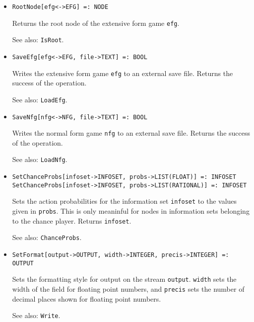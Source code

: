 \begin{itemize}
\item
\protect \large \begin{verbatim}
RootNode[efg<->EFG] =: NODE
\end{verbatim}\normalsize

\bd
Returns the root node of the extensive form game \verb+efg+.
\item
[See also:] {\tt IsRoot}.
\ed


\item
\protect \large \begin{verbatim}
SaveEfg[efg<->EFG, file->TEXT] =: BOOL
\end{verbatim}\normalsize

\bd
Writes the extensive form game \verb+efg+ to an external
save file.  Returns the success of the operation.
\item
[See also:] {\tt LoadEfg}.
\ed

\item
\protect \large \begin{verbatim}
SaveNfg[nfg<->NFG, file->TEXT] =: BOOL
\end{verbatim}\normalsize

\bd
Writes the normal form game \verb+nfg+ to an external
save file.  Returns the success of the operation.
\item
[See also:] {\tt LoadNfg}.
\ed

\item
\protect \large \begin{verbatim} 
SetChanceProbs[infoset->INFOSET, probs->LIST(FLOAT)] =: INFOSET
SetChanceProbs[infoset->INFOSET, probs->LIST(RATIONAL)] =: INFOSET
\end{verbatim}\normalsize

\bd
Sets the action probabilities for the information set
\verb+infoset+ to the values given in \verb+probs+.  This is only
meaninful for nodes in information sets belonging to the chance
player.  Returns \verb+infoset+. 
\item
[See also:] {\tt ChanceProbs}.
\ed

\item
\protect \large \begin{verbatim}
SetFormat[output->OUTPUT, width->INTEGER, precis->INTEGER] =: OUTPUT
\end{verbatim}\normalsize

\bd
Sets the formatting style for output on the stream
\verb+output+.  \verb+width+ sets the width of the field for floating
point numbers, and \verb+precis+ sets the number of decimal places shown
for floating point numbers.
\item
[See also:] {\tt Write}.
\ed


\end{itemize}
